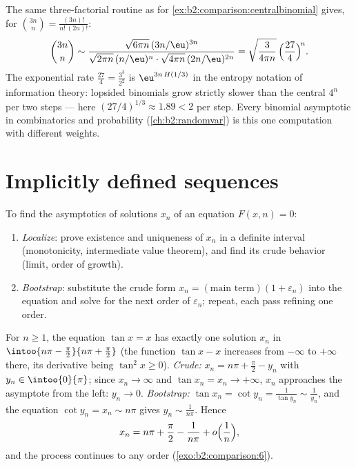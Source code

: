 \begin{example}\label{ex:b2:comparison:lopsided}
The same three-factorial routine as for
\cref{ex:b2:comparison:centralbinomial} gives, for
$\binom{3n}{n} = \frac{(3n)!}{n!\,(2n)!}$:
\[
\binom{3n}{n} \sim
\frac{\sqrt{6\pi n}\,(3n/\eu)^{3n}}
{\sqrt{2\pi n}\,(n/\eu)^{n}\cdot\sqrt{4\pi n}\,(2n/\eu)^{2n}}
= \sqrt{\frac{3}{4\pi n}}\,
\Bigl(\frac{27}{4}\Bigr)^{\!n} .
\]
The exponential rate $\frac{27}4 = \frac{3^3}{2^2}$ is
$\eu^{3n\,H(1/3)}$ in the entropy notation of information
theory: lopsided binomials grow strictly slower than the central
$4^n$ per two steps --- here $(27/4)^{1/3} \approx 1.89 < 2$ per
step. Every binomial asymptotic in combinatorics and probability
(\cref{ch:b2:randomvar}) is this one computation with different
weights.
\end{example}

\section{Implicitly defined sequences}

\begin{method}\label{met:b2:comparison:implicit}
To find the asymptotics of solutions $x_n$ of an equation $F(x, n) =
0$:
\begin{enumerate}
  \item \emph{Localize}: prove existence and uniqueness of $x_n$ in
        a definite interval (monotonicity, intermediate value
        theorem), and find its crude behavior (limit, order of
        growth).
  \item \emph{Bootstrap}: substitute the crude form $x_n = (\text{main
        term})(1 + \varepsilon_n)$ into the equation and solve for
        the next order of $\varepsilon_n$; repeat, each pass
        refining one order.
\end{enumerate}
\end{method}

\begin{example}\label{ex:b2:comparison:tan}
For $n \geq 1$, the equation $\tan x = x$ has exactly one solution
$x_n$ in $\intoo{n\pi - \frac\pi2}{n\pi + \frac\pi2}$ (the function
$\tan x - x$ increases from $-\infty$ to $+\infty$ there, its
derivative being $\tan^2 x \geq 0$). \emph{Crude:} $x_n = n\pi +
\frac\pi2 - y_n$ with $y_n \in \intoo{0}{\pi}$; since $x_n \to
\infty$ and $\tan x_n = x_n \to +\infty$, $x_n$ approaches the
asymptote from the left: $y_n \to 0$. \emph{Bootstrap:} $\tan x_n =
\cot y_n = \frac{1}{\tan y_n} \sim \frac{1}{y_n}$, and the equation
$\cot y_n = x_n \sim n\pi$ gives $y_n \sim \frac{1}{n\pi}$. Hence
\[
x_n = n\pi + \frac\pi2 - \frac{1}{n\pi} +
o\Bigl(\frac1n\Bigr),
\]
and the process continues to any order
(\cref{exo:b2:comparison:6}).
\end{example}

